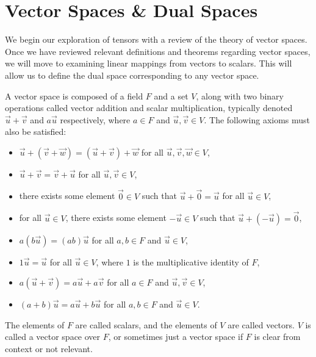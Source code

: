 \documentclass[../main.tex]{subfiles}
\begin{document}
    \section{Vector Spaces \& Dual Spaces}
    We begin our exploration of tensors with a review of the theory of vector spaces. Once we have reviewed relevant definitions and theorems regarding vector spaces, we will move to examining linear mappings from vectors to scalars. This will allow us to define the dual space corresponding to any vector space.

    \begin{definition}
        A vector space is composed of a field \(F\) and a set \(V\), along with two binary operations called vector addition and scalar multiplication, typically denoted \(\vec{u}+\vec{v}\) and \(a\vec{u}\) respectively, where \(a \in F\) and \(\vec{u}, \vec{v} \in V\). The following axioms must also be satisfied:
        \begin{itemize}
            \item \(\vec{u}+(\vec{v}+\vec{w}) = (\vec{u}+\vec{v})+\vec{w}\) for all \(\vec{u}, \vec{v}, \vec{w} \in V\),
            \item \(\vec{u}+\vec{v} = \vec{v}+\vec{u}\) for all \(\vec{u}, \vec{v} \in V\),
            \item there exists some element \(\vec{0} \in V\) such that \(\vec{u}+\vec{0} = \vec{u}\) for all \(\vec{u} \in V\),
            \item for all \(\vec{u} \in V\), there exists some element \(-\vec{u} \in V\) such that \(\vec{u}+(-\vec{u}) = \vec{0}\),
            \item \(a(b\vec{u}) = (ab)\vec{u}\) for all \(a, b \in F\) and \(\vec{u} \in V\),
            \item \(1\vec{u} = \vec{u}\) for all \(\vec{u} \in V\), where \(1\) is the multiplicative identity of \(F\),
            \item \(a(\vec{u}+\vec{v}) = a\vec{u}+a\vec{v}\) for all \(a \in F\) and \(\vec{u}, \vec{v} \in V\),
            \item \((a+b)\vec{u} = a\vec{u}+b\vec{u}\) for all \(a, b \in F\) and \(\vec{u} \in V\).
        \end{itemize}
        The elements of \(F\) are called scalars, and the elements of \(V\) are called vectors. \(V\) is called a vector space over \(F\), or sometimes just a vector space if \(F\) is clear from context or not relevant.
    \end{definition}
\end{document}
